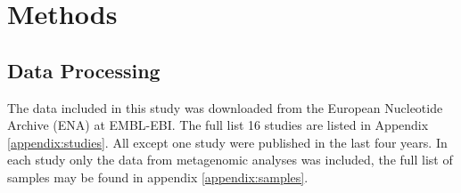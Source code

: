 \chapter{Methods}
% 
%



\section{Data Processing}
The data included in this study was downloaded from the European Nucleotide Archive (ENA) at EMBL-EBI\cite{embl-ebi2025ENABrowser}. The full list 16 studies are listed in Appendix \ref{appendix:studies}. 
All except one study were published in the last four years.
In each study only the data from metagenomic analyses was included, the full list of samples may be found in appendix \ref{appendix:samples}.  %

